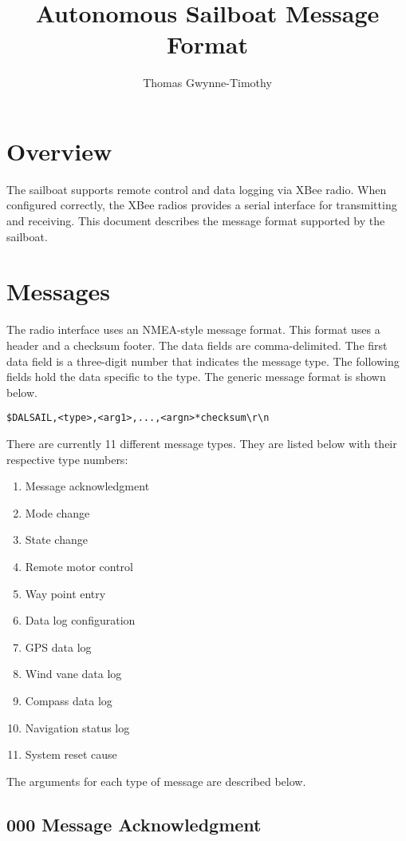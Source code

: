 \documentclass[12pt]{article}
\title{Autonomous Sailboat Message Format}
\author{Thomas Gwynne-Timothy}
\def\threedigits#1{%
	\ifnum#1<100 0\fi
	\ifnum#1<10 0\fi
	\number#1}
\begin{document}
\section*{Overview}

The sailboat supports remote control and data logging via XBee radio. When configured correctly, the XBee radios provides a serial interface for transmitting and receiving. This document describes the message format supported by the sailboat.

\section*{Messages}

The radio interface uses an NMEA-style message format. This format uses a header and a checksum footer. The data fields are comma-delimited. The first data field is a three-digit number that indicates the message type. The following fields hold the data specific to the type. The generic message format is shown below.

\begin{center}
	\texttt{\$DALSAIL,<type>,<arg1>,...,<argn>*checksum\textbackslash r\textbackslash n}
\end{center}

\noindent 
There are currently 11 different message types. They are listed below with their respective type numbers:

\begin{enumerate}[label={\textbf{\protect\threedigits{\theenumi}}}, start=0, leftmargin=0.4\linewidth]
	\setlength\itemsep{0.1em}
	\item Message acknowledgment
	\item Mode change
	\item State change
	\item Remote motor control
	\item Way point entry
	\item Data log configuration
	\item GPS data log
	\item Wind vane data log
	\item Compass data log
	\item Navigation status log
	\item System reset cause
\end{enumerate}

\noindent
The arguments for each type of message are described below.

\subsection*{\textbf{000} Message Acknowledgment}
\end{document}
